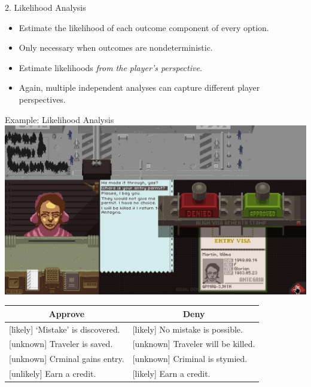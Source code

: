 \documentclass[xcolor=x11names]{beamer}
\begin{document}
\begin{frame}{2. Likelihood Analysis}
  \begin{itemize}\addtolength{\itemsep}{0.5\baselineskip}
    \item Estimate the likelihood of each outcome component of every option.
    \item Only necessary when outcomes are nondeterministic.
    \item Estimate likelihoods \emph{from the player's perspective}.
    \item Again, multiple independent analyses can capture different player perspectives.
  \end{itemize}
\end{frame}

\begin{frame}{Example: Likelihood Analysis}
  \centering
  \includegraphics[height=0.3\textheight]{res/papersplease-large.png} \\
  \vspace*{1em}
  \small
  \begin{tabular}{l l}
    \toprule
    \multicolumn{1}{c}{\textbf{Approve}} & \multicolumn{1}{c}{\textbf{Deny}} \\
    \midrule
    {[likely] `Mistake' is discovered.} & [likely] No mistake is possible. \\
    {[unknown] Traveler is saved.} & [unknown] Traveler will be killed. \\
    {[unknown] Crminal gains entry.} & [unknown] Criminal is stymied. \\
    {[unlikely] Earn a credit.} & [likely] Earn a credit. \\
    \bottomrule
  \end{tabular}
\end{frame}
\end{document}
